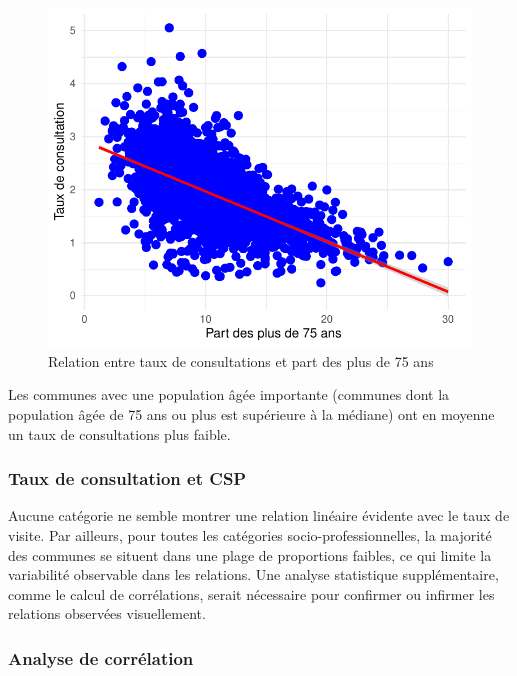\documentclass[
]{article}
\begin{document}
\begin{figure}

{\centering \includegraphics{rapport_intermediaire_files/figure-latex/unnamed-chunk-14-1} 

}

\caption{Relation entre taux de consultations et part des plus de 75 ans}\label{fig:unnamed-chunk-14}
\end{figure}

Les communes avec une population âgée importante (communes dont la
population âgée de 75 ans ou plus est supérieure à la médiane) ont en
moyenne un taux de consultations plus faible.

\hypertarget{taux-de-consultation-et-csp}{%
\subsubsection{Taux de consultation et
CSP}\label{taux-de-consultation-et-csp}}

Aucune catégorie ne semble montrer une relation linéaire évidente avec
le taux de visite. Par ailleurs, pour toutes les catégories
socio-professionnelles, la majorité des communes se situent dans une
plage de proportions faibles, ce qui limite la variabilité observable
dans les relations. Une analyse statistique supplémentaire, comme le
calcul de corrélations, serait nécessaire pour confirmer ou infirmer les
relations observées visuellement.

\hypertarget{analyse-de-corruxe9lation}{%
\subsubsection{Analyse de corrélation}\label{analyse-de-corruxe9lation}}
\end{document}
